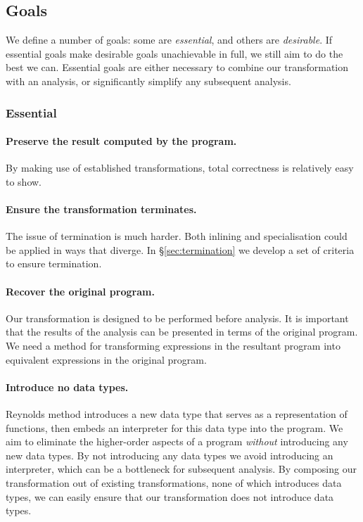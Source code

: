 \documentclass[preprint]{sigplanconf}
\begin{document}
\subsection{Goals}
\label{sec:goals}

We define a number of goals: some are \textit{essential}, and others are \textit{desirable}. If essential goals make desirable goals unachievable in full, we still aim to do the best we can. Essential goals are either necessary to combine our transformation with an analysis, or significantly simplify any subsequent analysis.

\subsubsection*{Essential}

\paragraph{Preserve the result computed by the program.} By making use of established transformations, total correctness is relatively easy to show.

\paragraph{Ensure the transformation terminates.} The issue of termination is much harder. Both inlining and specialisation could be applied in ways that diverge. In \S\ref{sec:termination} we develop a set of criteria to ensure termination.

\paragraph{Recover the original program.} Our transformation is designed to be performed before analysis. It is important that the results of the analysis can be presented in terms of the original program. We need a method for transforming expressions in the resultant program into equivalent expressions in the original program.

\paragraph{Introduce no data types.} Reynolds method introduces a new data type that serves as a representation of functions, then embeds an interpreter for this data type into the program. We aim to eliminate the higher-order aspects of a program \textit{without} introducing any new data types. By not introducing any data types we avoid introducing an interpreter, which can be a bottleneck for subsequent analysis. By composing our transformation out of existing transformations, none of which introduces data types, we can easily ensure that our transformation does not introduce data types.
\end{document}

